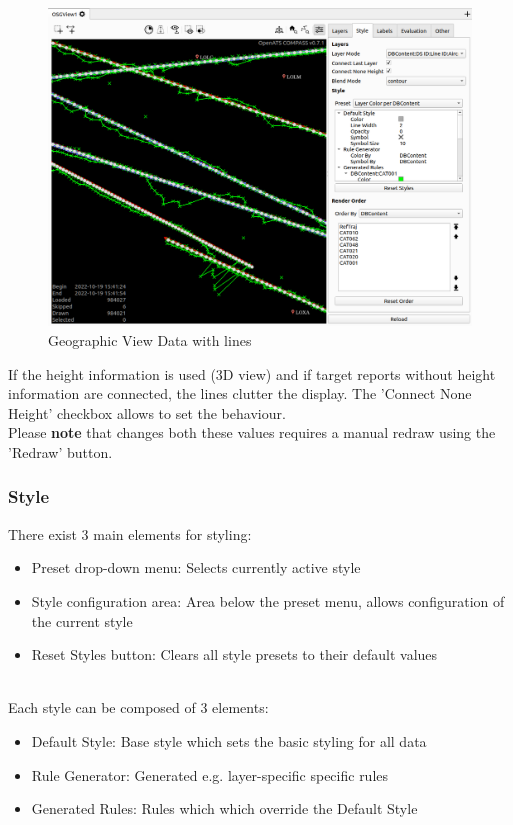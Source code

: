 \begin{figure}[H]
    \hspace*{-2.5cm}
    \includegraphics[width=19cm,frame]{figures/geoview_connect_lines.png}
  \caption{Geographic View Data with lines}
\end{figure}

If the height information is used (3D view) and if target reports without height information are connected, the lines clutter the display. The 'Connect None Height' checkbox allows to set the behaviour. \\

Please \textbf{note} that changes both these values requires a manual redraw using the 'Redraw' button.

\subsubsection{Style}
\label{sec:style}

There exist 3 main elements for styling:
\begin{itemize}
 \item Preset drop-down menu: Selects currently active style
 \item Style configuration area: Area below the preset menu, allows configuration of the current style
 \item Reset Styles button: Clears all style presets to their default values
\end{itemize}
\  \\

Each style can be composed of 3 elements:
\begin{itemize}
 \item Default Style: Base style which sets the basic styling for all data
 \item Rule Generator: Generated e.g. layer-specific specific rules
 \item Generated Rules: Rules which which override the Default Style
\end{itemize}
\  \\

